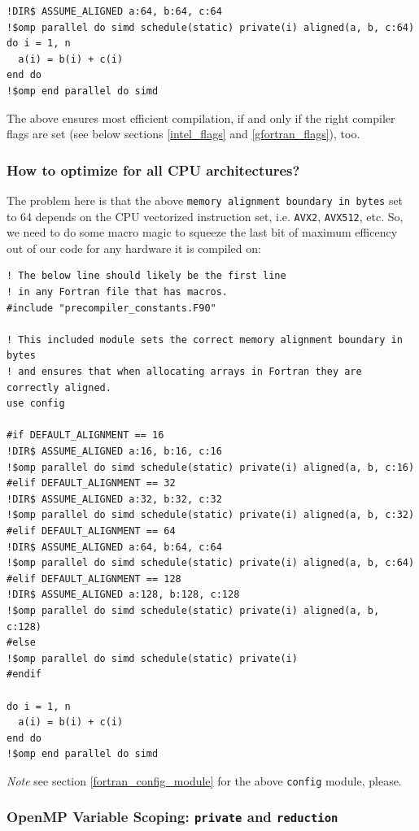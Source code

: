 \documentclass{article}
\begin{document}
\begin{verbatim}
!DIR$ ASSUME_ALIGNED a:64, b:64, c:64
!$omp parallel do simd schedule(static) private(i) aligned(a, b, c:64)
do i = 1, n
  a(i) = b(i) + c(i)
end do
!$omp end parallel do simd
\end{verbatim}

The above ensures most efficient compilation, if and only if the right compiler
flags are set (see below sections \ref{intel_flags} and \ref{gfortran_flags}),
too.

\subsubsection{How to optimize for all CPU architectures?}
\label{simd_architecture_macros}

The problem here is that the above \texttt{memory alignment boundary in bytes}
set to 64 depends on the CPU vectorized instruction set, i.e. \texttt{AVX2},
\texttt{AVX512}, etc. So, we need to do some macro magic to squeeze the last
bit of maximum efficency out of our code for any hardware it is compiled on:

\begin{verbatim}
! The below line should likely be the first line
! in any Fortran file that has macros.
#include "precompiler_constants.F90"

! This included module sets the correct memory alignment boundary in bytes
! and ensures that when allocating arrays in Fortran they are correctly aligned.
use config

#if DEFAULT_ALIGNMENT == 16
!DIR$ ASSUME_ALIGNED a:16, b:16, c:16
!$omp parallel do simd schedule(static) private(i) aligned(a, b, c:16)
#elif DEFAULT_ALIGNMENT == 32
!DIR$ ASSUME_ALIGNED a:32, b:32, c:32
!$omp parallel do simd schedule(static) private(i) aligned(a, b, c:32)
#elif DEFAULT_ALIGNMENT == 64
!DIR$ ASSUME_ALIGNED a:64, b:64, c:64
!$omp parallel do simd schedule(static) private(i) aligned(a, b, c:64)
#elif DEFAULT_ALIGNMENT == 128
!DIR$ ASSUME_ALIGNED a:128, b:128, c:128
!$omp parallel do simd schedule(static) private(i) aligned(a, b, c:128)
#else
!$omp parallel do simd schedule(static) private(i)
#endif

do i = 1, n
  a(i) = b(i) + c(i)
end do
!$omp end parallel do simd
\end{verbatim}

\emph{Note} see section \ref{fortran_config_module} for the above
\texttt{config} module, please.

\subsubsection{OpenMP Variable Scoping: \texttt{private} and \texttt{reduction}}
\end{document}
